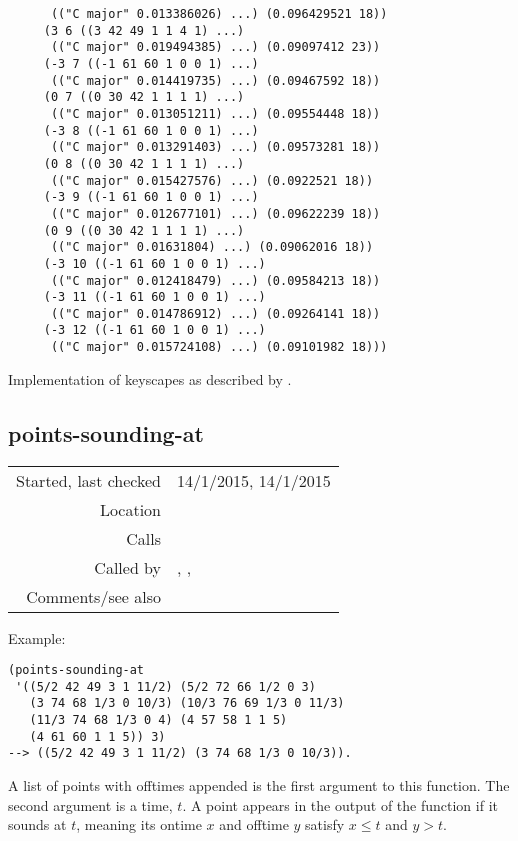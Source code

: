 \begin{verbatim}
      (("C major" 0.013386026) ...) (0.096429521 18))
     (3 6 ((3 42 49 1 1 4 1) ...)
      (("C major" 0.019494385) ...) (0.09097412 23))
     (-3 7 ((-1 61 60 1 0 0 1) ...)
      (("C major" 0.014419735) ...) (0.09467592 18))
     (0 7 ((0 30 42 1 1 1 1) ...)
      (("C major" 0.013051211) ...) (0.09554448 18))
     (-3 8 ((-1 61 60 1 0 0 1) ...)
      (("C major" 0.013291403) ...) (0.09573281 18))
     (0 8 ((0 30 42 1 1 1 1) ...)
      (("C major" 0.015427576) ...) (0.0922521 18))
     (-3 9 ((-1 61 60 1 0 0 1) ...)
      (("C major" 0.012677101) ...) (0.09622239 18))
     (0 9 ((0 30 42 1 1 1 1) ...)
      (("C major" 0.01631804) ...) (0.09062016 18))
     (-3 10 ((-1 61 60 1 0 0 1) ...)
      (("C major" 0.012418479) ...) (0.09584213 18))
     (-3 11 ((-1 61 60 1 0 0 1) ...)
      (("C major" 0.014786912) ...) (0.09264141 18))
     (-3 12 ((-1 61 60 1 0 0 1) ...)
      (("C major" 0.015724108) ...) (0.09101982 18)))
\end{verbatim}

\noindent Implementation of keyscapes as described by
\citet{sapp2005}.


\subsection*{points-sounding-at}\label{fun:points-sounding-at}

\vspace{0.3cm}
\begin{tabular}{r|p{8cm}}
Started, last checked & 14/1/2015, 14/1/2015 \\
Location & \nameref{sec:keyscape} \\
Calls & \\
Called by & \nameref{fun:PAC-bass-membfn}, \nameref{fun:PAC-melody-membfn}, \nameref{fun:unite-states-and-points} \\
Comments/see also & \nameref{fun:datapoints-sounding-between}
\end{tabular}

\vspace{0.5cm}
\noindent Example:
\begin{verbatim}
(points-sounding-at
 '((5/2 42 49 3 1 11/2) (5/2 72 66 1/2 0 3)
   (3 74 68 1/3 0 10/3) (10/3 76 69 1/3 0 11/3)
   (11/3 74 68 1/3 0 4) (4 57 58 1 1 5)
   (4 61 60 1 1 5)) 3)
--> ((5/2 42 49 3 1 11/2) (3 74 68 1/3 0 10/3)).
\end{verbatim}

\noindent A list of points with offtimes appended is
the first argument to this function. The second
argument is a time, $t$. A point appears in the output
of the function if it sounds at $t$, meaning its ontime
$x$ and offtime $y$ satisfy $x \leq t$ and $y > t$.


